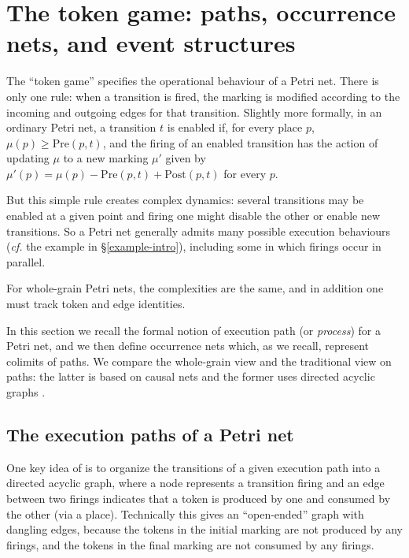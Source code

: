 \documentclass[11pt,a4paper]{article}
\theoremstyle{plain}
\theoremstyle{definition}
\theoremstyle{remark}
\newcommand{\Pre}{\mathrm{Pre}}
\newcommand{\Post}{\mathrm{Post}}
\begin{document}
\section{The token game: paths, occurrence nets, and event structures}
\label{subsec:occ}

The ``token game'' specifies the operational behaviour of a Petri net. There is
only one rule: when a transition is fired, the marking is modified according to
the incoming and outgoing edges for that transition. Slightly more formally, in an ordinary Petri net, a transition $t$ is enabled if, for every place $p$, $\mu(p) \geq \Pre(p, t)$, and the firing of an enabled transition has the action of updating $\mu$ to a new marking $\mu'$ given by $\mu'(p) = \mu(p) - \Pre(p, t) + \Post(p, t)$ for every $p$.

But this simple rule creates complex dynamics: several transitions may be enabled at a given point and firing one might disable the other or enable new transitions. So a Petri net generally admits many possible execution behaviours (\emph{cf.} the example in \S\ref{example-intro}), including some in which firings occur in parallel.

For whole-grain Petri nets, the complexities are the same, and in addition one must track token and edge identities. 

In this section we recall the formal notion of execution path (or \emph{process}) for a Petri net, and we then define occurrence nets which, as we recall, represent colimits of paths. We compare the whole-grain view and the traditional view on paths: the latter is based on causal nets \cite{ES1} and the former uses directed acyclic graphs
\cite{WGPN}.

\subsection{The execution paths of a Petri net}
\label{subsec:ex-paths}

One key idea of \cite{WGPN} is to organize the transitions of a given execution path
into a directed acyclic graph, where a node represents a transition firing and an edge
between two firings indicates that a token is produced by one and consumed by
the other (via a place). Technically this gives an ``open-ended'' graph with dangling edges, because the tokens in the initial marking are not produced by any firings, and the tokens in the final marking are not consumed by any firings. 
\end{document}
